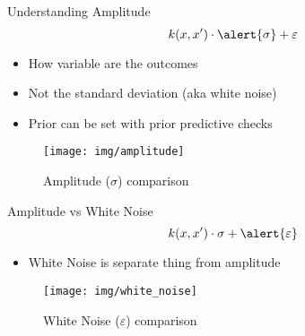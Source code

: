\documentclass{beamer}
\begin{document}
\begin{frame}{Understanding Amplitude}
\begin{equation*}
    k(x, x') \cdot \alert{\sigma} + \varepsilon 
\end{equation*}
\begin{itemize}
    \item How variable are the outcomes
    \item Not the standard deviation (aka white noise)
    \item Prior can be set with prior predictive checks
\end{itemize}
\begin{figure}
    \centering
    \texttt{[image: img/amplitude]}
    \caption{Amplitude ($\sigma$) comparison}
\end{figure}
\end{frame}
\begin{frame}{Amplitude vs White Noise}
\begin{equation*}
    k(x, x') \cdot \sigma + \alert{\varepsilon}
\end{equation*}
    \begin{itemize}
        \item White Noise is separate thing from amplitude
    \end{itemize}
    \begin{figure}
        \centering
        \texttt{[image: img/white\_noise]}
        \caption{White Noise ($\varepsilon$) comparison}
    \end{figure}
\end{frame}
\end{document}
